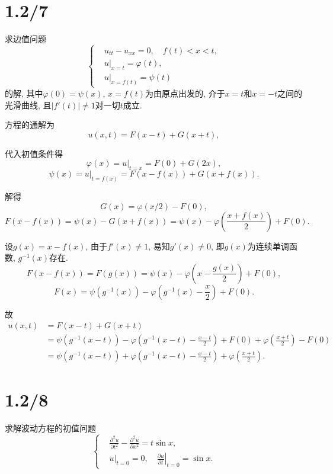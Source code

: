 \documentclass[11pt,a4paper]{article}
\begin{document}
\section{1.2/7}
\begin{problem}
求边值问题
$$\left\{\begin{aligned}
     & u_{tt}-u_{xx}=0,\quad f(t)<x<t, \\
     & u|_{x=t}=\varphi(t),            \\
     & u|_{x=f(t)}=\psi(t)
  \end{aligned}\right.$$
的解, 其中$\varphi(0)=\psi(x)$, $x=f(t)$为由原点出发的, 介于$x=t$和$x=-t$之间的光滑曲线, 且$|f'(t)|\neq1$对一切$t$成立.
\end{problem}

方程的通解为
$$u(x,t)=F(x-t)+G(x+t),$$

代入初值条件得
$$\varphi(x)=u|_{t=x}=F(0)+G(2x),$$
$$\psi(x)=u|_{t=f(x)}=F(x-f(x))+G(x+f(x)).$$

解得
$$G(x)=\varphi(x/2)-F(0),$$
$$F(x-f(x))=\psi(x)-G(x+f(x))=\psi(x)-\varphi\left(\frac{x+f(x)}{2}\right)+F(0).$$

设$g(x)=x-f(x)$, 由于$f'(x)\neq 1$, 易知$g'(x)\neq 0$, 即$g(x)$为连续单调函数, $g^{-1}(x)$存在.
$$F(x-f(x))=F(g(x))=\psi(x)-\varphi\left(x-\frac{g(x)}{2}\right)+F(0),$$
$$F(x)=\psi(g^{-1}(x))-\varphi\left(g^{-1}(x)-\frac{x}{2}\right)+F(0).$$

故
\begin{align*}
  u(x,t) & =F(x-t)+G(x+t)                                                                                               \\
         & =\psi(g^{-1}(x-t))-\varphi\left(g^{-1}(x-t)-\frac{x-t}{2}\right)+F(0)+\varphi\left(\frac{x+t}{2}\right)-F(0) \\
         & =\psi(g^{-1}(x-t))+\varphi\left(g^{-1}(x-t)-\frac{x-t}{2}\right)+\varphi\left(\frac{x+t}{2}\right).
\end{align*}

\section{1.2/8}
\begin{problem}
求解波动方程的初值问题
$$\left\{\begin{aligned}
     & \frac{\partial^2u}{\partial t^2}-\frac{\partial^2u}{\partial x^2}=t\sin x, \\
     & u|_{t=0}=0,\quad \left.\frac{\partial u}{\partial t}\right|_{t=0}=\sin x.
  \end{aligned}\right.$$
\end{problem}
\end{document}
